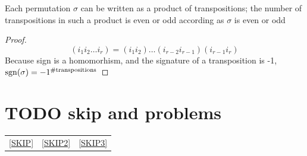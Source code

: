 \documentclass[11pt]{article}
\begin{document}
\begin{corollary}[]
Each permutation \(\sigma\) can be written as a product of transpositions; the number of transpositions
in such a product is even or odd according as \(\sigma\) is even or odd
\end{corollary}

\begin{proof}
\begin{equation*}
(i_1i_2\dots i_r)=(i_1i_2)\dots(i_{r-2}i_{r-1})(i_{r-1}i_r)
\end{equation*}
Because sign is a homomorhism, and the signature of a transposition is -1, \(\operatorname{sgn}(\sigma)=-1^{\#\text{transpositions}}\)
\end{proof}

\section{{\bfseries\sffamily TODO} skip and problems}
\label{sec:org1aac292}
\begin{center}
\begin{tabular}{lll}
\ref{SKIP} & \ref{SKIP2} & \ref{SKIP3}\\
\end{tabular}
\end{center}
\end{document}
